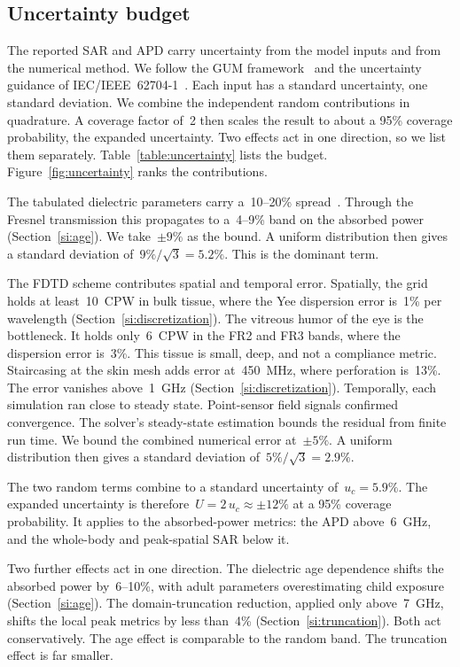 \documentclass{iopjournal}
\begin{document}
\subsection{Uncertainty budget}
\label{si:uncertainty}

The reported \gls{SAR} and \gls{APD} carry uncertainty from the model inputs and from the numerical method.
We follow the GUM framework~\citep{jcgm2008uncertainty} and the uncertainty guidance of IEC/IEEE~62704-1~\citep{iec62704}.
Each input has a standard uncertainty, one standard deviation.
We combine the independent random contributions in quadrature.
A coverage factor of~2 then scales the result to about a 95\% coverage probability, the expanded uncertainty.
Two effects act in one direction, so we list them separately.
Table~\ref{table:uncertainty} lists the budget. Figure~\ref{fig:uncertainty} ranks the contributions.

The tabulated dielectric parameters carry a~10--20\% spread~\citep{gabriel1996dielectric,kos2011exposure}.
Through the Fresnel transmission this propagates to a~4--9\% band on the absorbed power (Section~\ref{si:age}).
We take~$\pm 9\%$ as the bound. A uniform distribution then gives a standard deviation of~$9\%/\sqrt{3} = 5.2\%$.
This is the dominant term.

The \gls{FDTD} scheme contributes spatial and temporal error.
Spatially, the grid holds at least~10~\gls{CPW} in bulk tissue, where the Yee dispersion error is~1\% per wavelength (Section~\ref{si:discretization}).
The vitreous humor of the eye is the bottleneck. It holds only~6~\gls{CPW} in the FR2 and FR3 bands, where the dispersion error is~3\%.
This tissue is small, deep, and not a compliance metric.
Staircasing at the skin mesh adds error at~450~MHz, where perforation is~13\%. The error vanishes above~1~GHz (Section~\ref{si:discretization}).
Temporally, each simulation ran close to steady state.
Point-sensor field signals confirmed convergence. The solver's steady-state estimation bounds the residual from finite run time.
We bound the combined numerical error at~$\pm 5\%$. A uniform distribution then gives a standard deviation of~$5\%/\sqrt{3} = 2.9\%$.

The two random terms combine to a standard uncertainty of~$u_c = 5.9\%$.
The expanded uncertainty is therefore~$U = 2\,u_c \approx \pm 12\%$ at a 95\% coverage probability.
It applies to the absorbed-power metrics: the \gls{APD} above~6~GHz, and the whole-body and peak-spatial \gls{SAR} below it.

Two further effects act in one direction.
The dielectric age dependence shifts the absorbed power by~6--10\%, with adult parameters overestimating child exposure (Section~\ref{si:age}).
The domain-truncation reduction, applied only above~7~GHz, shifts the local peak metrics by less than~4\% (Section~\ref{si:truncation}).
Both act conservatively. The age effect is comparable to the random band. The truncation effect is far smaller.
\end{document}
